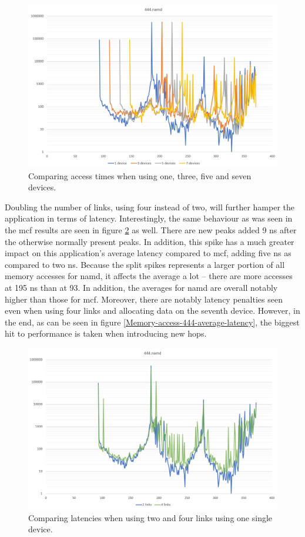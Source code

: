 \begin{figure}[!ht]
    \centering
    \includegraphics[width=1\linewidth]{figure/444-x_4-1.jpg}
    \caption{Comparing access times when using one, three, five and seven devices.}
    \label{Memory-access-444}
\end{figure}

Doubling the number of links, using four instead of two, will further hamper the application in terms of latency. Interestingly, the same behaviour as was seen in the mcf results are seen in figure \ref{Memory-access-444-links-compare} as well. There are new peaks added 9 ns after the otherwise normally present peaks. In addition, this spike has a much greater impact on this application's average latency compared to mcf, adding five ns as compared to two ns. Because the split spikes represents a larger portion of all memory accesses for namd, it affects the average a lot -- there are more accesses at 195 ns than at 93. In addition, the averages for namd are overall notably higher than those for mcf. Moreover, there are notably latency penalties seen even when using four links and allocating data on the seventh device. However, in the end, as can be seen in figure \ref{Memory-access-444-average-latency}, the biggest hit to performance is taken when introducing new hops. 
\bigskip

\begin{figure}[!ht]
    \centering
    \includegraphics[width=1.0\linewidth]{figure/444-2_4-8.jpg}
    \caption{Comparing latencies when using two and four links using one single device.}
    \label{Memory-access-444-links-compare}
\end{figure}

